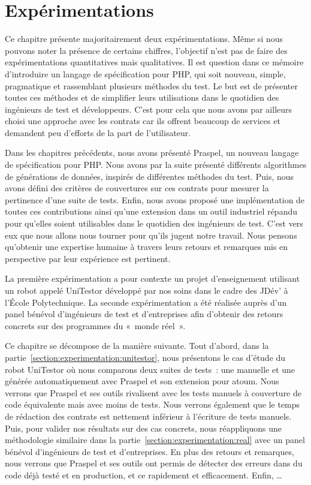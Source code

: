 \chapter{Expérimentations}
\label{chapter:experimentations}

\minitoc

Ce chapitre présente majoritairement deux expérimentations. Même si nous pouvons
noter la présence de certains chiffres, l'objectif n'est pas de faire des
expérimentations {\strong quantitatives} mais {\strong qualitatives}.
Il est question dans ce mémoire d'introduire un langage de spécification pour
PHP, qui soit nouveau, simple, pragmatique et rassemblant plusieurs méthodes du
test. Le but est de présenter toutes ces méthodes et de simplifier leurs
utilisations dans le quotidien des ingénieurs de test et développeurs. C'est
pour cela que nous avons par ailleurs choisi une approche avec les contrats car
ils offrent beaucoup de services et demandent peu d'efforts de la part de
l'utilisateur.

Dans les chapitres précédents, nous avons présenté Praspel, un nouveau langage
de spécification pour PHP. Nous avons par la suite présenté différents
algorithmes de générations de données, inspirés de différentes méthodes du test.
Puis, nous avons défini des critères de couvertures sur ces contrats pour
mesurer la pertinence d'une suite de tests. Enfin, nous avons proposé une
implémentation de toutes ces contributions ainsi qu'une extension dans un outil
industriel répandu pour qu'elles soient utilisables dans le quotidien des
ingénieurs de test. C'est vers eux que nous allons nous tourner pour qu'ils
jugent notre travail. Nous pensons qu'obtenir une expertise humaine à travers
leurs retours et remarques mis en perspective par leur expérience est pertinent.

La première expérimentation a pour contexte un projet d'enseignement utilisant
un robot appelé UniTestor développé par nos soins dans le cadre des JDév' à
l'École Polytechnique. La seconde expérimentation a été réalisée auprès d'un
panel bénévol d'ingénieurs de test et d'entreprises afin d'obtenir des retours
concrets sur des programmes du «~monde réel~».

Ce chapitre se décompose de la manière suivante. Tout d'abord, dans la
partie~\ref{section:experimentation:unitestor}, nous présentons le cas d'étude
du robot UniTestor où nous comparons deux suites de tests~: une manuelle et une
générée automatiquement avec Praspel et son extension pour atoum. Nous verrons
que Praspel et ses outils rivalisent avec les tests manuels à couverture de code
équivalente mais avec moins de tests. Nous verrons également que le temps de
rédaction des contrats est nettement inférieur à l'écriture de tests manuels.
Puis, pour valider nos résultats sur des cas concrets, nous réappliquons une
méthodologie similaire dans la partie~\ref{section:experimentation:real} avec un
panel bénévol d'ingénieurs de test et d'entreprises. En plus des retours et
remarques, nous verrons que Praspel et ses outils ont permis de détecter des
erreurs dans du code déjà testé et en production, et ce rapidement et
efficacement. Enfin, …

